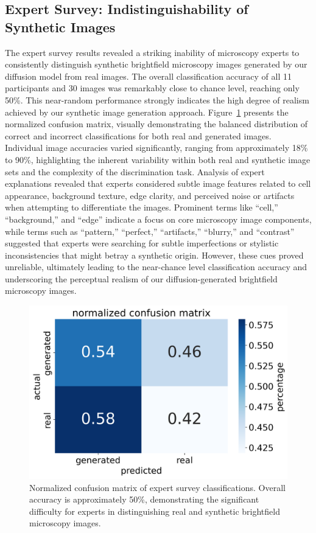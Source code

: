 \subsection{Expert Survey: Indistinguishability of Synthetic Images}
\label{subsec:expert-survey:-indistinguishability-of-synthetic-images}
The expert survey results revealed a striking inability of microscopy experts to consistently distinguish synthetic brightfield microscopy images generated by our diffusion model from real images.
The overall classification accuracy of all 11 participants and 30 images was remarkably close to chance level, reaching only 50\%.
This near-random performance strongly indicates the high degree of realism achieved by our synthetic image generation approach.
Figure~\ref{fig:conf_matrix} presents the normalized confusion matrix, visually demonstrating the balanced distribution of correct and incorrect classifications for both real and generated images.
Individual image accuracies varied significantly, ranging from approximately 18\% to 90\%, highlighting the inherent variability within both real and synthetic image sets and the complexity of the discrimination task.
Analysis of expert explanations revealed that experts considered subtle image features related to cell appearance, background texture, edge clarity, and perceived noise or artifacts when attempting to differentiate the images.
Prominent terms like ``cell,'' ``background,'' and ``edge'' indicate a focus on core microscopy image components, while terms such as ``pattern,'' ``perfect,'' ``artifacts,'' ``blurry,'' and ``contrast'' suggested that experts were searching for subtle imperfections or stylistic inconsistencies that might betray a synthetic origin.
However, these cues proved unreliable, ultimately leading to the near-chance level classification accuracy and underscoring the perceptual realism of our diffusion-generated brightfield microscopy images.
\begin{figure}
    \centering
    \includegraphics[width=0.75\linewidth]{images/norm_confusion_matrix}
    \caption{Normalized confusion matrix of expert survey classifications. Overall accuracy is approximately 50\%, demonstrating the significant difficulty for experts in distinguishing real and synthetic brightfield microscopy images.}
    \label{fig:conf_matrix}
\end{figure}

